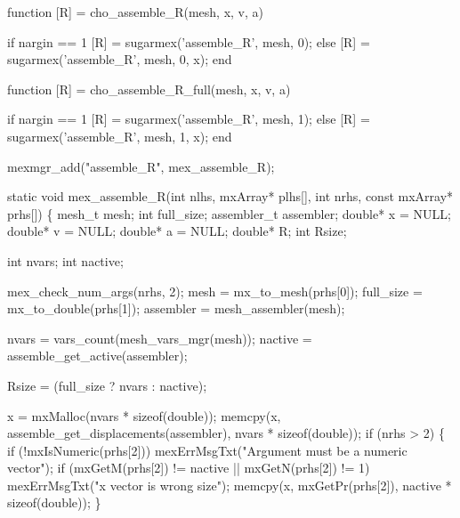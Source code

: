 \nwenddocs{}\endmoddef
function [R] = cho_assemble_R(mesh, x, v, a)

if nargin == 1
    [R] = sugarmex('assemble_R', mesh, 0);
else
    [R] = sugarmex('assemble_R', mesh, 0, x);
end
\nwendcode{}\nwdocspar

\nwenddocs{}\endmoddef
function [R] = cho_assemble_R_full(mesh, x, v, a)

if nargin == 1
    [R] = sugarmex('assemble_R', mesh, 1);
else
    [R] = sugarmex('assemble_R', mesh, 1, x);
end
\nwendcode{}\nwdocspar

\nwenddocs{}\plusendmoddef
mexmgr_add("assemble_R", mex_assemble_R);
\nwendcode{}\nwdocspar

\nwenddocs{}\plusendmoddef
static void mex_assemble_R(int nlhs, mxArray* plhs[],
                           int nrhs, const mxArray* prhs[])
\{
    mesh_t      mesh;
    int         full_size;
    assembler_t assembler;
    double*     x = NULL;
    double*     v = NULL;
    double*     a = NULL;
    double*     R;
    int         Rsize;

    int nvars;
    int nactive;

    mex_check_num_args(nrhs, 2);
    mesh      = mx_to_mesh(prhs[0]);
    full_size = mx_to_double(prhs[1]);
    assembler = mesh_assembler(mesh);

    nvars   = vars_count(mesh_vars_mgr(mesh));
    nactive = assemble_get_active(assembler);

    Rsize   = (full_size ? nvars : nactive);

    x = mxMalloc(nvars * sizeof(double));
    memcpy(x, assemble_get_displacements(assembler), nvars * sizeof(double));
    if (nrhs > 2) \{
        if (!mxIsNumeric(prhs[2]))
            mexErrMsgTxt("Argument must be a numeric vector");
        if (mxGetM(prhs[2]) != nactive || mxGetN(prhs[2]) != 1)
            mexErrMsgTxt("x vector is wrong size");
        memcpy(x, mxGetPr(prhs[2]), nactive * sizeof(double));
    \}

